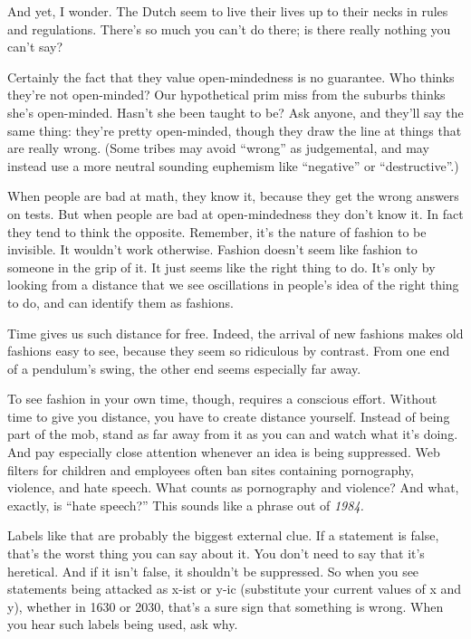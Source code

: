 \documentclass[12pt]{book}
\begin{document}
And yet, I wonder. The Dutch seem to live their lives up to their necks
in rules and regulations. There's so much you can't do there; is there
really nothing you can't say?

Certainly the fact that they value open-mindedness is no guarantee. Who
thinks they're not open-minded? Our hypothetical prim miss from the
suburbs thinks she's open-minded. Hasn't she been taught to be? Ask
anyone, and they'll say the same thing: they're pretty open-minded,
though they draw the line at things that are really wrong. (Some tribes
may avoid ``wrong'' as judgemental, and may instead use a more neutral
sounding euphemism like ``negative'' or ``destructive''.)

When people are bad at math, they know it, because they get the wrong
answers on tests. But when people are bad at open-mindedness they don't
know it. In fact they tend to think the opposite. Remember, it's the
nature of fashion to be invisible. It wouldn't work otherwise. Fashion
doesn't seem like fashion to someone in the grip of it. It just seems
like the right thing to do. It's only by looking from a distance that we
see oscillations in people's idea of the right thing to do, and can
identify them as fashions.

Time gives us such distance for free. Indeed, the arrival of new
fashions makes old fashions easy to see, because they seem so ridiculous
by contrast. From one end of a pendulum's swing, the other end seems
especially far away.

To see fashion in your own time, though, requires a conscious effort.
Without time to give you distance, you have to create distance yourself.
Instead of being part of the mob, stand as far away from it as you can
and watch what it's doing. And pay especially close attention whenever
an idea is being suppressed. Web filters for children and employees
often ban sites containing pornography, violence, and hate speech. What
counts as pornography and violence? And what, exactly, is ``hate
speech?'' This sounds like a phrase out of \emph{1984.}

Labels like that are probably the biggest external clue. If a statement
is false, that's the worst thing you can say about it. You don't need to
say that it's heretical. And if it isn't false, it shouldn't be
suppressed. So when you see statements being attacked as x-ist or y-ic
(substitute your current values of x and y), whether in 1630 or 2030,
that's a sure sign that something is wrong. When you hear such labels
being used, ask why.
\end{document}
